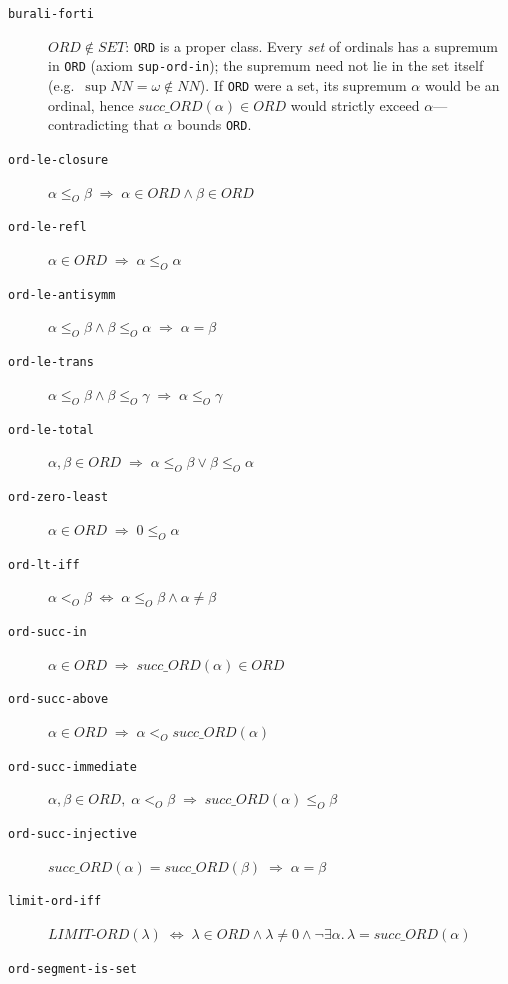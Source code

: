 \documentclass{amsbook}[openany]
\theoremstyle{definition}
\theoremstyle{remark}
\theoremstyle{remark}
\begin{document}
\begin{description}
\item[\texttt{burali-forti}]
  $\mathit{ORD} \notin \mathit{SET}$: \texttt{ORD} is a proper class.
  Every \emph{set} of ordinals has a supremum in \texttt{ORD}
  (axiom \texttt{sup-ord-in}); the supremum need not lie in the set itself
  (e.g.\ $\sup \mathit{NN} = \omega \notin \mathit{NN}$).
  If \texttt{ORD} were a set, its supremum $\alpha$ would be an ordinal,
  hence $\mathit{succ\_ORD}(\alpha) \in \mathit{ORD}$ would strictly
  exceed $\alpha$---contradicting that $\alpha$ bounds \texttt{ORD}.
\item[\texttt{ord-le-closure}]
  $\alpha \leq_O \beta \;\Rightarrow\; \alpha \in \mathit{ORD} \land \beta \in \mathit{ORD}$
\item[\texttt{ord-le-refl}]
  $\alpha \in \mathit{ORD} \;\Rightarrow\; \alpha \leq_O \alpha$
\item[\texttt{ord-le-antisymm}]
  $\alpha \leq_O \beta \land \beta \leq_O \alpha \;\Rightarrow\; \alpha = \beta$
\item[\texttt{ord-le-trans}]
  $\alpha \leq_O \beta \land \beta \leq_O \gamma \;\Rightarrow\; \alpha \leq_O \gamma$
\item[\texttt{ord-le-total}]
  $\alpha,\beta \in \mathit{ORD} \;\Rightarrow\; \alpha \leq_O \beta \lor \beta \leq_O \alpha$
\item[\texttt{ord-zero-least}]
  $\alpha \in \mathit{ORD} \;\Rightarrow\; 0 \leq_O \alpha$
\item[\texttt{ord-lt-iff}]
  $\alpha <_O \beta \;\Leftrightarrow\; \alpha \leq_O \beta \land \alpha \neq \beta$
\item[\texttt{ord-succ-in}]
  $\alpha \in \mathit{ORD} \;\Rightarrow\; \mathit{succ\_ORD}(\alpha) \in \mathit{ORD}$
\item[\texttt{ord-succ-above}]
  $\alpha \in \mathit{ORD} \;\Rightarrow\; \alpha <_O \mathit{succ\_ORD}(\alpha)$
\item[\texttt{ord-succ-immediate}]
  $\alpha,\beta \in \mathit{ORD},\; \alpha <_O \beta \;\Rightarrow\; \mathit{succ\_ORD}(\alpha) \leq_O \beta$
\item[\texttt{ord-succ-injective}]
  $\mathit{succ\_ORD}(\alpha) = \mathit{succ\_ORD}(\beta) \;\Rightarrow\; \alpha = \beta$
\item[\texttt{limit-ord-iff}]
  $\mathit{LIMIT\text{-}ORD}(\lambda) \;\Leftrightarrow\; \lambda \in \mathit{ORD} \land \lambda \neq 0 \land \lnot\exists\alpha.\,\lambda = \mathit{succ\_ORD}(\alpha)$
\item[\texttt{ord-segment-is-set}]

\end{description}
\end{document}
